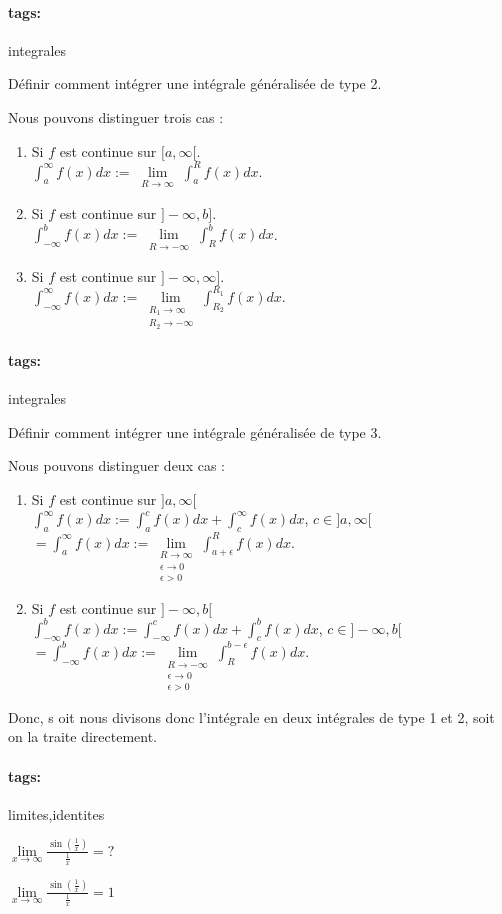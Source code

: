 \documentclass[12pt]{article}
\newcommand*{\xfield}[1]{\begin{mdframed}\centering #1\end{mdframed}\bigskip}
\newenvironment{note}{}{}
\newcommand*{\tags}[1]{\paragraph{tags: }#1}
\begin{document}
\begin{note}
	\tags{integrales}
	\xfield{Définir comment intégrer une intégrale généralisée de type 2.}
	\xfield{Nous pouvons distinguer trois cas :\begin{enumerate}
		\item Si $f$ est continue sur $[a,\infty[$.\\
		$\int_{a}^{\infty} f(x)dx := \lim\limits_{\substack{R \to \infty}} \int_{a}^{R}f(x)dx$.
		\item Si $f$ est continue sur $]-\infty,b]$.\\
		$\int_{-\infty}^{b} f(x)dx := \lim\limits_{\substack{R \to -\infty}} \int_{R}^{b}f(x)dx$.
		\item Si $f$ est continue sur $]-\infty,\infty]$.\\
		$\int_{-\infty}^{\infty} f(x)dx := \lim\limits_{\substack{R_1 \to \infty \\ R_2 \to -\infty}} \int_{R_2}^{R_1}f(x)dx$.
	\end{enumerate} }
\end{note}

\begin{note}
	\tags{integrales}
	\xfield{Définir comment intégrer une intégrale généralisée de type 3.}
	\xfield{Nous pouvons distinguer deux cas :\begin{enumerate}
		\item Si $f$ est continue sur $]a,\infty[$ \\
			$\int_{a}^{\infty} f(x)dx := \int_{a}^{c} f(x)dx + \int_{c}^{\infty}f(x)dx$, $c \in ]a,\infty[$\\
			$= \int_{a}^{\infty} f(x)dx := \lim\limits_{\substack{R \to \infty \\ \epsilon \to 0 \\ \epsilon > 0}} \int_{a+\epsilon}^{R}f(x)dx$.\\
		\item Si $f$ est continue sur $]-\infty,b[$ \\
			$\int_{-\infty}^{b} f(x)dx := \int_{-\infty}^{c} f(x)dx + \int_{c}^{b}f(x)dx$, $c \in ]-\infty,b[$\\
			$= \int_{-\infty}^{b} f(x)dx := \lim\limits_{\substack{R \to -\infty \\ \epsilon \to 0 \\ \epsilon > 0}} \int_{R}^{b-\epsilon}f(x)dx$.\\
	\end{enumerate}
	Donc, s oit nous divisons donc l'intégrale en deux intégrales de type 1 et 2, soit on la traite directement.}
\end{note}
\begin{note}
	\tags{limites,identites}
	\xfield{$\lim\limits_{x \to \infty}\frac{\sin(\frac{1}{x})}{\frac{1}{x}} = ?$}
	\xfield{$\lim\limits_{x \to \infty}\frac{\sin(\frac{1}{x})}{\frac{1}{x}} = 1$}
\end{note}
\end{document}
